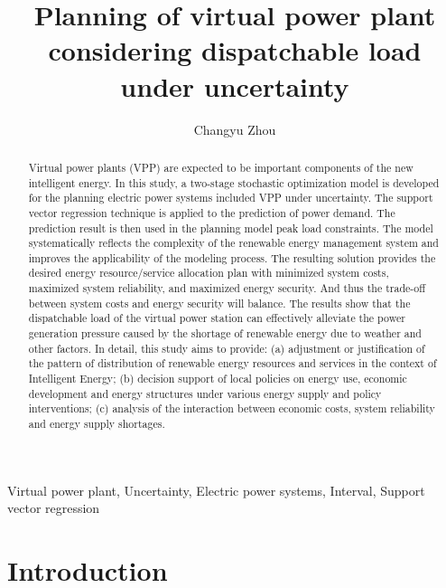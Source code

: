 \documentclass[twocolumn,a4paper]{IEEEtran}
\title{Planning of virtual power plant considering dispatchable load under uncertainty}
\author{Changyu Zhou}
\begin{document}
\maketitle
\begin{abstract}
Virtual power plants (VPP) are expected to be important components of the new intelligent energy. 
In this study, a two-stage stochastic optimization model is developed for the planning electric power systems included VPP under uncertainty. 
The support vector regression technique is applied to the prediction of power demand. 
The prediction result is then used in the planning model peak load constraints. 
The model systematically reflects the complexity of the renewable energy management system and improves the applicability of the modeling process. 
The resulting solution provides the desired energy resource/service allocation plan with minimized system costs, maximized system reliability, and maximized energy security. 
And thus the trade-off between system costs and energy security will balance. The results show that the dispatchable load of the virtual power station can effectively alleviate the power generation pressure caused by the shortage of renewable energy due to weather and other factors. 
In detail, this study aims to provide: 
(a) adjustment or justification of the pattern of distribution of renewable energy resources and services in the context of Intelligent Energy; 
(b) decision support of local policies on energy use, economic development and energy structures under various energy supply and policy interventions; 
(c) analysis of the interaction between economic costs, system reliability and energy supply shortages. 
\end{abstract}
\begin{IEEEkeywords}
Virtual power plant, Uncertainty, Electric power systems, Interval, Support vector regression
\end{IEEEkeywords}
\section{Introduction}
\end{document}
